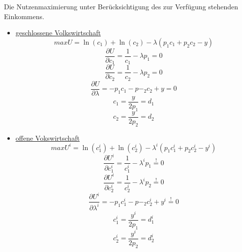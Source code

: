 Die Nutzenmaximierung unter Berücksichtigung des zur Verfügung stehenden Einkommens. 
\begin{itemize}
\item \underline{geschlossene Volkswirtschaft}
\begin{equation} maxU=\ln(c_1)+\ln(c_2)-\lambda (p_1c_1+p_2c_2-y)\end{equation}
\begin{displaymath}\frac{\partial U}{\partial c_1}=\frac{1}{c_1}-\lambda p_1=0\end{displaymath}
\begin{displaymath} \frac{\partial U}{\partial c_2}=\frac{1}{c_2}-\lambda p_2=0\end{displaymath}
\begin{displaymath} \frac{\partial U}{\partial \lambda}=-p_1c_1-p-_2c_2+y=0\end{displaymath}
\begin{equation} c_1=\frac{y}{2p_1}=d_1\end{equation}
\begin{equation} c_2=\frac{y}{2p_2}=d_2\end{equation}

\item \underline{offene Vokswirtschaft}
\begin{equation} maxU^i=\ln(c^i_1)+\ln(c^i_2)-\lambda^i (p_1c^i_1+p_2c^i_2-y^i)\end{equation}
\begin{equation}\frac{\partial U^i}{\partial c^i_1}=\frac{1}{c^i_1}-\lambda^i p_1\overset{!}{=}0\end{equation}
\begin{equation}\frac{\partial U^i}{\partial c^i_2}=\frac{1}{c^i_2}-\lambda^i p_2\overset{!}{=}0\end{equation}
\begin{equation}\frac{\partial U^i}{\partial \lambda^i}=-p_1c^i_1-p-_2c^i_2+y^i\overset{!}{=}0\end{equation}
\begin{equation} c^i_1=\frac{y^i}{2p_1}=d^i_1\end{equation}
\begin{equation} c^i_2=\frac{y^i}{2p_2}=d^i_2\end{equation}


\end{itemize}
